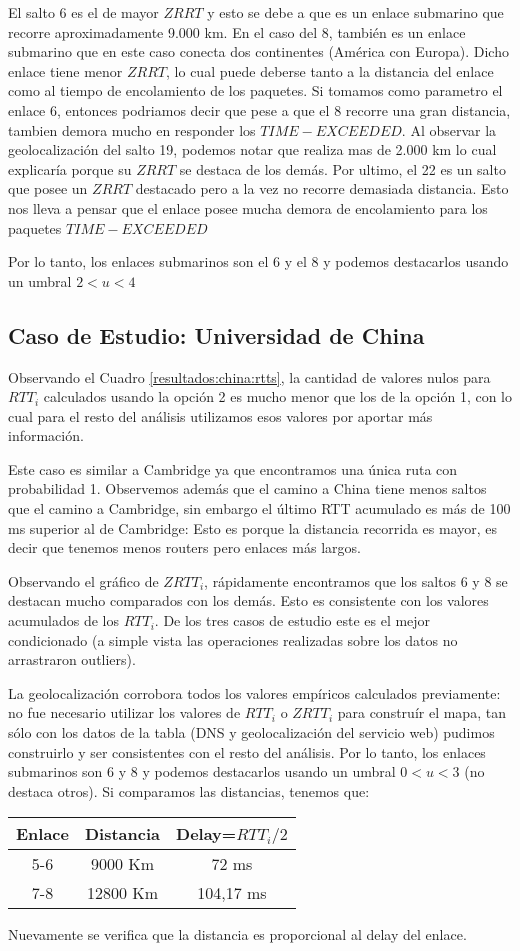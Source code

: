 El salto 6 es el de mayor $ZRRT$ y esto se debe a que es un enlace submarino que recorre aproximadamente 9.000 km. En el caso del 8, también es un enlace submarino que en este caso conecta dos continentes (América con Europa). Dicho enlace tiene menor $ZRRT$, lo cual puede deberse tanto a la distancia del enlace como al tiempo de encolamiento de los paquetes. Si tomamos como parametro el enlace 6, entonces podriamos decir que pese a que el 8 recorre una gran distancia, tambien demora mucho en responder los $TIME-EXCEEDED$. Al observar la geolocalización del salto 19, podemos notar que realiza mas de 2.000 km lo cual explicaría porque su $ZRRT$ se destaca de los demás. Por ultimo, el 22 es un salto que posee un $ZRRT$ destacado pero a la vez no recorre demasiada distancia. Esto nos lleva a pensar que el enlace posee mucha demora de encolamiento para los paquetes $TIME-EXCEEDED$

Por lo tanto, los enlaces submarinos son el 6 y el 8 y podemos destacarlos usando un umbral $2<u<4$


\subsection{Caso de Estudio: Universidad de China}

Observando el Cuadro \ref{resultados:china:rtts}, la cantidad de valores nulos para $RTT_i$ calculados usando la opción 2 es mucho menor que los de
la opción 1, con lo cual para el resto del análisis utilizamos esos valores por aportar más información.

Este caso es similar a Cambridge ya que encontramos una única ruta con probabilidad 1. Observemos además que el camino a China tiene menos saltos
que el camino a Cambridge, sin embargo el último RTT acumulado es más de 100 ms superior al de Cambridge: Esto es porque la distancia recorrida
es mayor, es decir que tenemos menos routers pero enlaces más largos.

Observando el gráfico de $ZRTT_i$, rápidamente encontramos que los saltos 6 y 8 se destacan mucho comparados con los demás. Esto es consistente
con los valores acumulados de los $RTT_i$. De los tres casos de estudio este es el mejor condicionado (a simple vista las operaciones realizadas
sobre los datos no arrastraron outliers).

La geolocalización corrobora todos los valores empíricos calculados previamente: no fue necesario utilizar los valores de $RTT_i$ o $ZRTT_i$ para
construír el mapa, tan sólo con los datos de la tabla (DNS y geolocalización del servicio web) pudimos construirlo y ser consistentes con el resto
del análisis. Por lo tanto, los enlaces submarinos son 6 y 8 y podemos destacarlos usando un umbral $0<u<3$ (no destaca otros). Si comparamos las distancias, tenemos que:

\begin{center}
 \begin{tabular}{|c|c|c|}
  \hline
  Enlace & Distancia & Delay=$RTT_i/2$ \\
  \hline
  5-6   & 9000 Km   & 72 ms\\
  \hline
  7-8   & 12800 Km   & 104,17 ms\\
  \hline
 \end{tabular}
\end{center}

Nuevamente se verifica que la distancia es proporcional al delay del enlace.